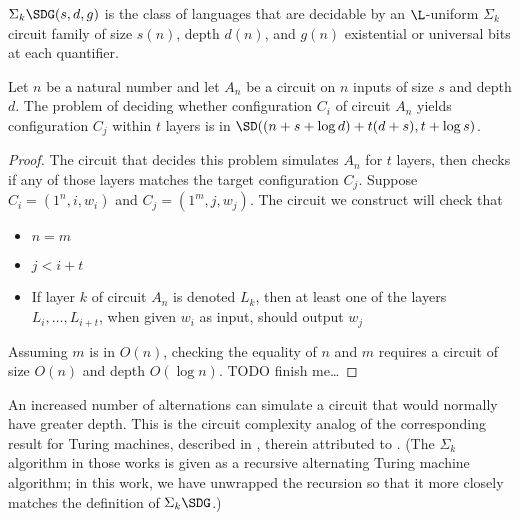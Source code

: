 \documentclass{article}
\begin{document}
\begin{definition}
  $\Sigma_k \SDG(s, d, g)$ is the class of languages that are decidable by an $\L$-uniform $\Sigma_k$ circuit family of size $s(n)$, depth $d(n)$, and $g(n)$ existential or universal bits at each quantifier.
\end{definition}

\begin{lemma}\label{lem:yields}
  Let $n$ be a natural number and let $A_n$ be a circuit on $n$ inputs of size $s$ and depth $d$.
  The problem of deciding whether configuration $C_i$ of circuit $A_n$ yields configuration $C_j$ within $t$ layers is in $\SD((n + s + \log d) + t(d + s), t + \log s)$.
\end{lemma}
\begin{proof}
  The circuit that decides this problem simulates $A_n$ for $t$ layers, then checks if any of those layers matches the target configuration $C_j$.
  Suppose $C_i = (1^n, i, w_i)$ and $C_j = (1^m, j, w_j)$.
  The circuit we construct will check that
  \begin{itemize}
  \item $n = m$
  \item $j < i + t$
  \item If layer $k$ of circuit $A_n$ is denoted $L_k$, then at least one of the layers $L_i, \dotsc, L_{i + t}$, when given $w_i$ as input, should output $w_j$
  \end{itemize}
  Assuming $m$ is in $O(n)$, checking the equality of $n$ and $m$ requires a circuit of size $O(n)$ and depth $O(\log n)$.
  TODO finish me\ldots
\end{proof}

An increased number of alternations can simulate a circuit that would normally have greater depth.
This is the circuit complexity analog of the corresponding result for Turing machines, described in \autocite[Lemma~2.7]{williams06}, therein attributed to \autocite[Theorem~5.1]{fvm00}.
(The $\Sigma_k$ algorithm in those works is given as a recursive alternating Turing machine algorithm; in this work, we have unwrapped the recursion so that it more closely matches the definition of $\Sigma_k \SDG$.)
\end{document}
